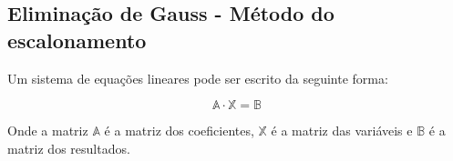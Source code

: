 

\subsection{Eliminação de Gauss - Método do escalonamento}

Um sistema de equações lineares pode ser escrito da seguinte forma:

$$
\mathbb{A}\cdot\mathbb{X}=\mathbb{B}
$$

Onde a matriz $\mathbb{A}$ é a matriz dos coeficientes, $\mathbb{X}$ é a matriz das variáveis e $\mathbb{B}$ é a matriz dos resultados.

